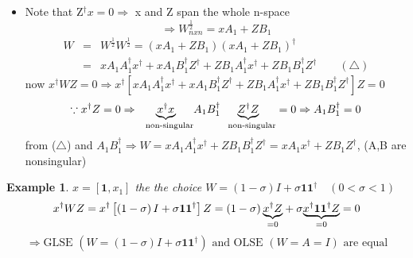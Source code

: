 \documentclass{article}
\newtheorem{example}[theorem]{Example}
\begin{document}
\begin{itemize}
\item Note that Z$^{\dagger }x=0\Rightarrow $ x and Z span the whole n-space%
\begin{equation*}
\Rightarrow W_{nxn}^{\frac{1}{2}}=xA_{1}+ZB_{1}
\end{equation*}%
\begin{eqnarray*}
W &=&W^{\frac{1}{2}}W^{\frac{1}{2}}=\left( xA_{1}+ZB_{1}\right) \left(
xA_{1}+ZB_{1}\right) ^{\dagger } \\
&=&xA_{1}A_{1}^{\dagger }x^{\dagger }+xA_{1}B_{1}^{\dagger }Z^{\dagger
}+ZB_{1}A_{1}^{\dagger }x^{\dagger }+ZB_{1}B_{1}^{\dagger }Z^{\dagger
}\qquad \left( \triangle \right)
\end{eqnarray*}%
now $x^{\dagger }WZ=0\Rightarrow x^{\dagger }\left[ xA_{1}A_{1}^{\dagger
}x^{\dagger }+xA_{1}B_{1}^{\dagger }Z^{\dagger }+ZB_{1}A_{1}^{\dagger
}x^{\dagger }+ZB_{1}B_{1}^{\dagger }Z^{\dagger }\right] Z=0$%
\begin{equation*}
\because x^{\dagger }Z=0\Rightarrow \underset{\text{non-singular}}{%
\underbrace{x^{\dagger }x}}A_{1}B_{1}^{\dagger }\underset{\text{non-singular}%
}{\underbrace{Z^{\dagger }Z}}=0\Rightarrow A_{1}B_{1}^{\dagger }=0
\end{equation*}%
from ($\triangle $) and $A_{1}B_{1}^{\dagger }\Rightarrow
W=xA_{1}A_{1}^{\dagger }x^{\dagger }+ZB_{1}B_{1}^{\dagger }Z^{\dagger
}=xA_{1}x^{\dagger }+ZB_{1}Z^{\dagger }$, (A,B are nonsingular)
\end{itemize}

\bigskip

\begin{example}
$x=\left[ \boldsymbol{1},x_{1}\right] $ the the choice $W=\left( 1-\sigma
\right) I+\sigma \boldsymbol{11}^{\dagger }\quad \left( 0<\sigma <1\right) $%
\begin{equation*}
x^{\dagger }WZ=x^{\dagger }\left[ \left( 1-\sigma \right) I+\sigma 
\boldsymbol{11}^{\dagger }\right] Z=\left( 1-\sigma \right) \underset{=0}{%
\underbrace{x^{\dagger }Z}}+\sigma \underset{=0}{\underbrace{x^{\dagger }%
\boldsymbol{11}^{\dagger }Z}}=0
\end{equation*}%
\begin{equation*}
\Rightarrow \text{GLSE }\left( W=\left( 1-\sigma \right) I+\sigma 
\boldsymbol{11}^{\dagger }\right) \text{ and OLSE }(W=A=I)\text{ are equal}
\end{equation*}
\end{example}

\bigskip
\end{document}

